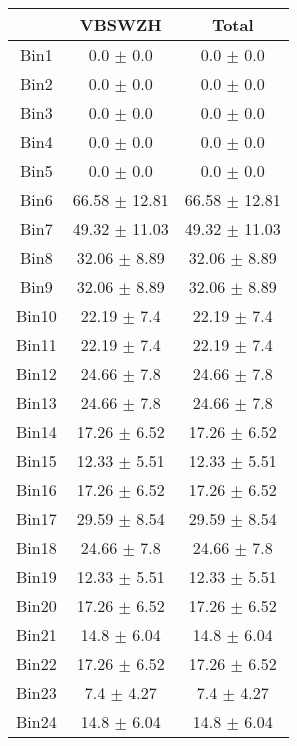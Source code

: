   \begin{tabular}{|c|c|c|}
  \hline
      & VBSWZH & Total \\ \cline{1-3} 
     \hline\hline
     Bin1 & 0.0 $\pm$ 0.0 & 0.0 $\pm$ 0.0 \\ \cline{1-3} 
     Bin2 & 0.0 $\pm$ 0.0 & 0.0 $\pm$ 0.0 \\ \cline{1-3} 
     Bin3 & 0.0 $\pm$ 0.0 & 0.0 $\pm$ 0.0 \\ \cline{1-3} 
     Bin4 & 0.0 $\pm$ 0.0 & 0.0 $\pm$ 0.0 \\ \cline{1-3} 
     Bin5 & 0.0 $\pm$ 0.0 & 0.0 $\pm$ 0.0 \\ \cline{1-3} 
     Bin6 & 66.58 $\pm$ 12.81 & 66.58 $\pm$ 12.81 \\ \cline{1-3} 
     Bin7 & 49.32 $\pm$ 11.03 & 49.32 $\pm$ 11.03 \\ \cline{1-3} 
     Bin8 & 32.06 $\pm$ 8.89 & 32.06 $\pm$ 8.89 \\ \cline{1-3} 
     Bin9 & 32.06 $\pm$ 8.89 & 32.06 $\pm$ 8.89 \\ \cline{1-3} 
     Bin10 & 22.19 $\pm$ 7.4 & 22.19 $\pm$ 7.4 \\ \cline{1-3} 
     Bin11 & 22.19 $\pm$ 7.4 & 22.19 $\pm$ 7.4 \\ \cline{1-3} 
     Bin12 & 24.66 $\pm$ 7.8 & 24.66 $\pm$ 7.8 \\ \cline{1-3} 
     Bin13 & 24.66 $\pm$ 7.8 & 24.66 $\pm$ 7.8 \\ \cline{1-3} 
     Bin14 & 17.26 $\pm$ 6.52 & 17.26 $\pm$ 6.52 \\ \cline{1-3} 
     Bin15 & 12.33 $\pm$ 5.51 & 12.33 $\pm$ 5.51 \\ \cline{1-3} 
     Bin16 & 17.26 $\pm$ 6.52 & 17.26 $\pm$ 6.52 \\ \cline{1-3} 
     Bin17 & 29.59 $\pm$ 8.54 & 29.59 $\pm$ 8.54 \\ \cline{1-3} 
     Bin18 & 24.66 $\pm$ 7.8 & 24.66 $\pm$ 7.8 \\ \cline{1-3} 
     Bin19 & 12.33 $\pm$ 5.51 & 12.33 $\pm$ 5.51 \\ \cline{1-3} 
     Bin20 & 17.26 $\pm$ 6.52 & 17.26 $\pm$ 6.52 \\ \cline{1-3} 
     Bin21 & 14.8 $\pm$ 6.04 & 14.8 $\pm$ 6.04 \\ \cline{1-3} 
     Bin22 & 17.26 $\pm$ 6.52 & 17.26 $\pm$ 6.52 \\ \cline{1-3} 
     Bin23 & 7.4 $\pm$ 4.27 & 7.4 $\pm$ 4.27 \\ \cline{1-3} 
     Bin24 & 14.8 $\pm$ 6.04 & 14.8 $\pm$ 6.04 \\ \cline{1-3} 

\end{tabular}
